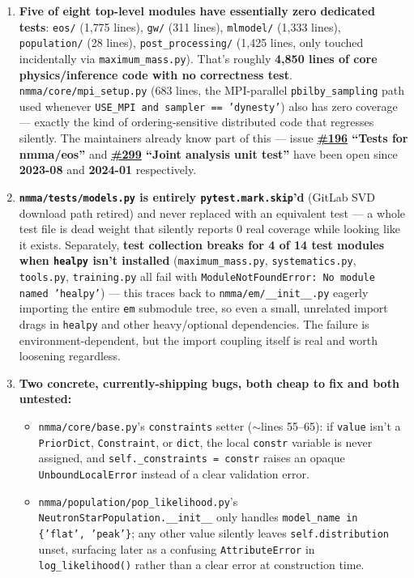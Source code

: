 \documentclass[10pt]{article}
\newcommand{\code}[1]{\texttt{#1}}
\begin{document}
\begin{enumerate}
\item \textbf{Five of eight top-level modules have essentially zero dedicated
  tests}: \code{eos/} (1{,}775 lines), \code{gw/} (311 lines), \code{mlmodel/}
  (1{,}333 lines), \code{population/} (28 lines), \code{post\_processing/} (1{,}425
  lines, only touched incidentally via \code{maximum\_mass.py}). That's roughly
  \textbf{4{,}850 lines of core physics/inference code with no correctness test}.
  \code{nmma/core/mpi\_setup.py} (683 lines, the MPI-parallel \code{pbilby\_sampling}
  path used whenever \code{USE\_MPI and sampler == 'dynesty'}) also has zero
  coverage --- exactly the kind of ordering-sensitive distributed code that
  regresses silently. The maintainers already know part of this --- issue
  \textbf{\href{https://github.com/nuclear-multimessenger-astronomy/nmma/issues/196}{\#196} ``Tests for nmma/eos''} and \textbf{\href{https://github.com/nuclear-multimessenger-astronomy/nmma/issues/299}{\#299} ``Joint analysis unit
  test''} have been open since \textbf{2023-08} and \textbf{2024-01} respectively.

\item \textbf{\code{nmma/tests/models.py} is entirely \code{pytest.mark.skip}'d}
  (GitLab SVD download path retired) and never replaced with an equivalent test ---
  a whole test file is dead weight that silently reports 0 real coverage while
  looking like it exists. Separately, \textbf{test collection breaks for 4 of
  14 test modules when \code{healpy} isn't installed} (\code{maximum\_mass.py},
  \code{systematics.py}, \code{tools.py}, \code{training.py} all fail with
  \code{ModuleNotFoundError: No module named 'healpy'}) --- this traces back to
  \code{nmma/em/\_\_init\_\_.py} eagerly importing the entire \code{em} submodule
  tree, so even a small, unrelated import drags in \code{healpy} and other
  heavy/optional dependencies. The failure is environment-dependent, but the import
  coupling itself is real and worth loosening regardless.

\item \textbf{Two concrete, currently-shipping bugs, both cheap to fix and both
  untested:}
  \begin{itemize}
  \item \code{nmma/core/base.py}'s \code{constraints} setter ($\sim$lines 55--65):
    if \code{value} isn't a \code{PriorDict}, \code{Constraint}, or \code{dict},
    the local \code{constr} variable is never assigned, and
    \code{self.\_constraints = constr} raises an opaque \code{UnboundLocalError}
    instead of a clear validation error.
  \item \code{nmma/population/pop\_likelihood.py}'s
    \code{NeutronStarPopulation.\_\_init\_\_} only handles
    \code{model\_name in \{'flat', 'peak'\}}; any other value silently leaves
    \code{self.distribution} unset, surfacing later as a confusing
    \code{AttributeError} in \code{log\_likelihood()} rather than a clear error at
    construction time.
  \end{itemize}


\end{enumerate}
\end{document}
